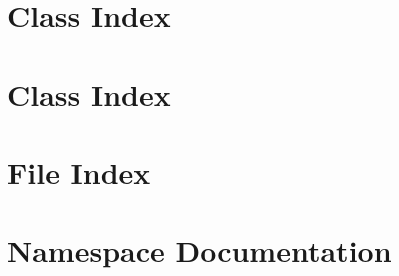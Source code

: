 \documentclass[a4paper]{article}
\begin{document}
\section{Class Index}

\section{Class Index}

\section{File Index}

\section{Namespace Documentation}





\end{document}
